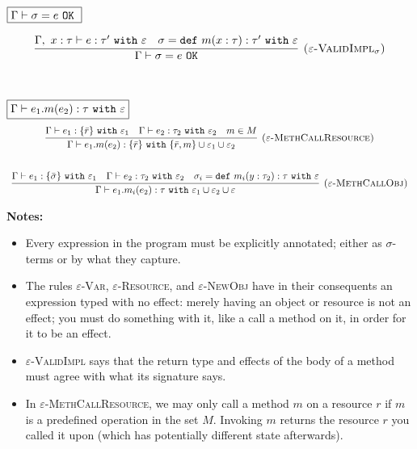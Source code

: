 \documentclass{llncs}
\newcommand{\keywadj}[1]{\mathtt{#1}}
\newcommand{\keyw}[1]{\keywadj{#1}~}
\begin{document}
$\fbox{$\Gamma \vdash \sigma = e~\keyw{OK}$}$

\[
\begin{array}{c}
\infer[\textsc{($\varepsilon$-ValidImpl$_\sigma$)}]
	{\Gamma \vdash \sigma = e~\keywadj{OK}}
	{\Gamma,~x:\tau \vdash e: \tau'~\keyw{with} \varepsilon & \sigma = \keyw{def} m(x:\tau):\tau'~\keyw{with} \varepsilon} \\[5ex]
\end{array}
\]

$\fbox{$\Gamma \vdash e_1.m(e_2) : \tau~\keyw{with} \varepsilon$}$
\[
\begin{array}{c}
\infer[\textsc{($\varepsilon$-MethCallResource)}]
	{\Gamma \vdash e_1.m(e_2) : \{ \bar r \}~\keyw{with} \{ \bar r, m\} \cup \varepsilon_1 \cup \varepsilon_2}
	{\Gamma \vdash e_1 : \{ \bar r \}~ \keyw{with} \varepsilon_1 & \Gamma \vdash e_2:\tau_2~\keyw{with} \varepsilon_2 & m \in M} \\[5ex]
	
\infer[\textsc{($\varepsilon$-MethCallObj)}]
	{\Gamma \vdash e_1.m_i(e_2):\tau~\keyw{with} \varepsilon_1 \cup \varepsilon_2 \cup \varepsilon}
	{\Gamma \vdash e_1 : \{ \bar \sigma \}~\keyw{with} \varepsilon_1 & \Gamma \vdash e_2 : \tau_2~\keyw{with} \varepsilon_2 & \sigma_i = \keyw{def} m_i(y:\tau_2):\tau~\keyw{with} \varepsilon}

\end{array}
\]

\noindent \textbf{Notes:}

\begin{itemize}
	\item Every expression in the program must be explicitly annotated; either as $\sigma$-terms or by what they capture.
	\item The rules \textsc{$\varepsilon$-Var}, \textsc{$\varepsilon$-Resource}, and \textsc{$\varepsilon$-NewObj} have in their consequents an expression typed with no effect: merely having an object or resource is not an effect; you must do something with it, like a call a method on it, in order for it to be an effect.
	\item \textsc{$\varepsilon$-ValidImpl} says that the return type and effects of the body of a method must agree with what its signature says.
	\item In \textsc{$\varepsilon$-MethCallResource}, we may only call a method $m$ on a resource $r$ if $m$ is a predefined operation in the set $M$. Invoking $m$ returns the resource $r$ you called it upon (which has potentially different state afterwards).
\end{itemize}
\end{document}
